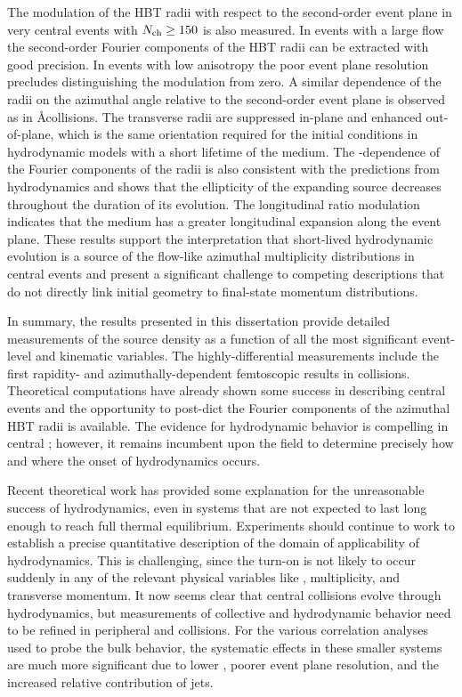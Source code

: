 The modulation of the HBT radii with respect to the second-order event plane in very central \pPb events with $\mbox{$N_{\mathrm{ch}}$} \geq 150$ is also measured.
In events with a large flow the second-order Fourier components of the HBT radii can be extracted with good precision.
In events with low anisotropy the poor event plane resolution precludes distinguishing the modulation from zero.
A similar dependence of the radii on the azimuthal angle relative to the second-order event plane is observed as in \AA collisions.
The transverse radii are suppressed in-plane and enhanced out-of-plane, which is the same orientation required for the initial conditions in hydrodynamic models with a short lifetime of the medium.
The \kt-dependence of the Fourier components of the radii is also consistent with the predictions from hydrodynamics and shows that the ellipticity of the expanding source decreases throughout the duration of its evolution.
The longitudinal ratio \Rlong modulation indicates that the medium has a greater longitudinal expansion along the event plane.
These results support the interpretation that short-lived hydrodynamic evolution is a source of the flow-like azimuthal multiplicity distributions in central \pPb events and present a significant challenge to competing descriptions that do not directly link initial geometry to final-state momentum distributions.

In summary, the results presented in this dissertation provide detailed measurements of the \pPb source density as a function of all the most significant event-level and kinematic variables.
The highly-differential measurements include the first rapidity- and azimuthally-dependent femtoscopic results in \pA collisions.
Theoretical computations have already shown some success in describing central \pPb events and the opportunity to post-dict the Fourier components of the azimuthal HBT radii is available.
The evidence for hydrodynamic behavior is compelling in central \pPb; however, it remains incumbent upon the field to determine precisely how and where the onset of hydrodynamics occurs.


Recent theoretical work has provided some explanation for the unreasonable success of hydrodynamics, even in systems that are not expected to last long enough to reach full thermal equilibrium.
Experiments should continue to work to establish a precise quantitative description of the domain of applicability of hydrodynamics.
This is challenging, since the turn-on is not likely to occur suddenly in any of the relevant physical variables like \Npart, multiplicity, and transverse momentum.
It now seems clear that central \pPb collisions evolve through hydrodynamics, but measurements of collective and hydrodynamic behavior need to be refined in peripheral \pPb and \pp collisions.
For the various correlation analyses used to probe the bulk behavior, the systematic effects in these smaller systems are much more significant due to lower \Nch, poorer event plane resolution, and the increased relative contribution of jets.

